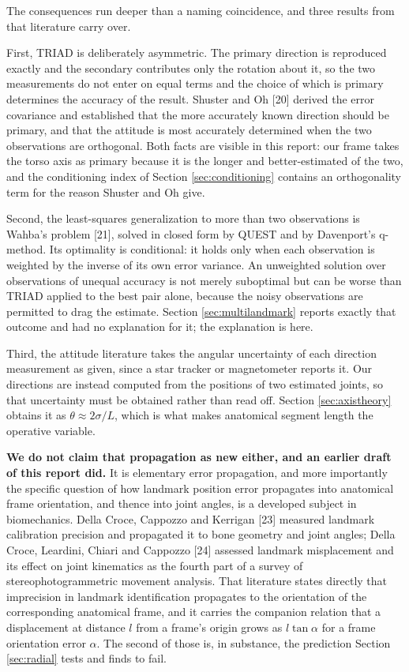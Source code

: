 \documentclass[12pt,a4paper]{report}
\begin{document}
The consequences run deeper than a naming coincidence, and three results from that literature carry over.

First, TRIAD is deliberately asymmetric. The primary direction is reproduced exactly and the secondary contributes only the rotation about it, so the two measurements do not enter on equal terms and the choice of which is primary determines the accuracy of the result. Shuster and Oh [20] derived the error covariance and established that the more accurately known direction should be primary, and that the attitude is most accurately determined when the two observations are orthogonal. Both facts are visible in this report: our frame takes the torso axis as primary because it is the longer and better-estimated of the two, and the conditioning index of Section \ref{sec:conditioning} contains an orthogonality term for the reason Shuster and Oh give.

Second, the least-squares generalization to more than two observations is Wahba's problem [21], solved in closed form by QUEST and by Davenport's q-method. Its optimality is conditional: it holds only when each observation is weighted by the inverse of its own error variance. An unweighted solution over observations of unequal accuracy is not merely suboptimal but can be worse than TRIAD applied to the best pair alone, because the noisy observations are permitted to drag the estimate. Section \ref{sec:multilandmark} reports exactly that outcome and had no explanation for it; the explanation is here.

Third, the attitude literature takes the angular uncertainty of each direction measurement as given, since a star tracker or magnetometer reports it. Our directions are instead computed from the positions of two estimated joints, so that uncertainty must be obtained rather than read off. Section \ref{sec:axistheory} obtains it as $\theta \approx 2\sigma/L$, which is what makes anatomical segment length the operative variable.

\textbf{We do not claim that propagation as new either, and an earlier draft of this report did.} It is elementary error propagation, and more importantly the specific question of how landmark position error propagates into anatomical frame orientation, and thence into joint angles, is a developed subject in biomechanics. Della Croce, Cappozzo and Kerrigan [23] measured landmark calibration precision and propagated it to bone geometry and joint angles; Della Croce, Leardini, Chiari and Cappozzo [24] assessed landmark misplacement and its effect on joint kinematics as the fourth part of a survey of stereophotogrammetric movement analysis. That literature states directly that imprecision in landmark identification propagates to the orientation of the corresponding anatomical frame, and it carries the companion relation that a displacement at distance $l$ from a frame's origin grows as $l \tan\alpha$ for a frame orientation error $\alpha$. The second of those is, in substance, the prediction Section \ref{sec:radial} tests and finds to fail.
\end{document}
